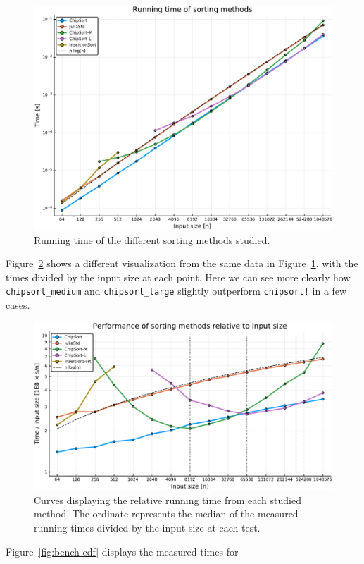 \documentclass{juliacon}
\begin{document}
\begin{figure}[htb]
\centerline{\includegraphics[width=0.99\linewidth]{fig/chipsort-bench-time.pdf}}
\caption{Running time of the different sorting methods studied.}
\label{fig:bench-time}
\end{figure}

Figure~\ref{fig:bench-curves} shows a different visualization from the same data in Figure~\ref{fig:bench-time}, with the times divided by the input size at each point. Here we can see more clearly how {\tt chipsort\_medium} and {\tt chipsort\_large} slightly outperform {\tt chipsort!} in a few cases.

\begin{figure}[htb]
\centerline{\includegraphics[width=0.75\linewidth]{fig/chipsort-bench-curves.pdf}}
\caption{Curves displaying the relative running time from each studied method. The ordinate represents the median of the measured running times divided by the input size at each test.}
\label{fig:bench-curves}
\end{figure}

Figure~\ref{fig:bench-cdf} displays the measured times for
\end{document}
